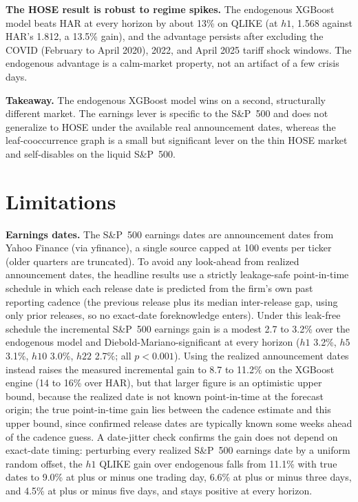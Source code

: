\documentclass[runningheads]{llncs}
\begin{document}
\textbf{The HOSE result is robust to regime spikes.} The endogenous XGBoost model beats HAR at every
horizon by about 13\% on QLIKE (at $h1$, 1.568 against HAR's 1.812, a 13.5\% gain), and the advantage
persists after excluding the COVID (February to April 2020), 2022, and April 2025 tariff shock windows.
The endogenous advantage is a calm-market property, not an artifact of a few crisis days.

\textbf{Takeaway.} The endogenous XGBoost model wins on a second, structurally different market. The
earnings lever is specific to the S\&P~500 and does not generalize to HOSE under the available real
announcement dates, whereas the leaf-cooccurrence graph is a small but significant lever on the thin
HOSE market and self-disables on the liquid S\&P~500.

\section{Limitations}
\noindent\textbf{Earnings dates.} The S\&P~500 earnings dates are announcement dates from Yahoo Finance
(via yfinance), a single source capped at 100 events per ticker (older quarters are truncated). To avoid
any look-ahead from realized announcement dates, the headline results use a strictly leakage-safe
point-in-time schedule in which each release date is predicted from the firm's own past reporting cadence
(the previous release plus its median inter-release gap, using only prior releases, so no exact-date
foreknowledge enters). Under this leak-free schedule the incremental S\&P~500 earnings gain is a modest
2.7 to 3.2\% over the endogenous model and Diebold-Mariano-significant at every horizon ($h1$ 3.2\%, $h5$
3.1\%, $h10$ 3.0\%, $h22$ 2.7\%; all $p<0.001$). Using the realized announcement dates instead raises the
measured incremental gain to 8.7 to 11.2\% on the XGBoost engine (14 to 16\% over HAR), but that larger
figure is an optimistic upper bound, because the realized date is not known point-in-time at the forecast
origin; the true point-in-time gain lies between the cadence estimate and this upper bound, since
confirmed release dates are typically known some weeks ahead of the cadence guess. A date-jitter check
confirms the gain does not depend on exact-date timing: perturbing every realized S\&P~500 earnings date
by a uniform random offset, the $h1$ QLIKE gain over endogenous falls from 11.1\% with true dates to
9.0\% at plus or minus one trading day, 6.6\% at plus or minus three days, and 4.5\% at plus or minus five
days, and stays positive at every horizon.
\end{document}
